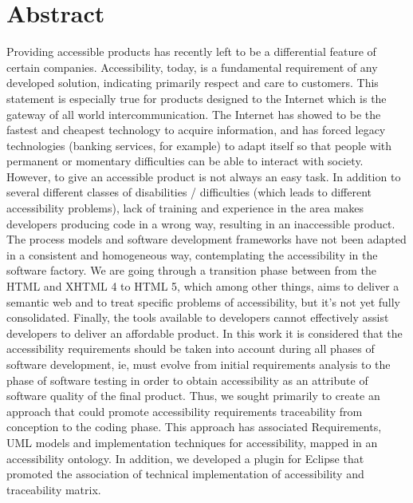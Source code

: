 \chapter*{Abstract}

Providing accessible products has recently left  to be a differential
feature of certain companies. Accessibility, today, is a fundamental requirement
of any developed solution, indicating primarily respect and care to
customers.
This statement is especially true for products designed to the Internet which is
the gateway of all  world intercommunication. The Internet has showed to be the
fastest and cheapest technology to acquire information, and has forced legacy
technologies (banking services, for example) to adapt itself so that people with
permanent or momentary difficulties can be able to interact with society.
However, to give an accessible product is not always an easy task. In addition to several different classes of disabilities / difficulties (which leads to
different accessibility problems), lack of training and experience in the area
makes developers producing code in a wrong way, resulting in an inaccessible
product.
The process models and software development frameworks have not been adapted in a
consistent and homogeneous way, contemplating the accessibility in the software
factory. We are going through a transition phase between from the HTML and
XHTML 4 to HTML 5, which among other things, aims to deliver a semantic web and
to treat specific problems of accessibility, but it's not yet fully
consolidated.
Finally, the tools available to developers cannot effectively assist developers to
deliver an affordable product. In this work it is considered that the accessibility requirements should be taken into account during all phases of software development, ie, must evolve from initial requirements analysis to the phase of software testing in order to obtain accessibility as an attribute of software quality of the final product. Thus, we sought primarily to create an approach that could promote accessibility requirements traceability from conception to the coding phase. This approach has associated Requirements, UML models and implementation techniques for accessibility, mapped in an accessibility ontology. In addition, we developed a plugin for Eclipse that promoted the association of technical implementation of accessibility and traceability matrix.

\label{abstract}